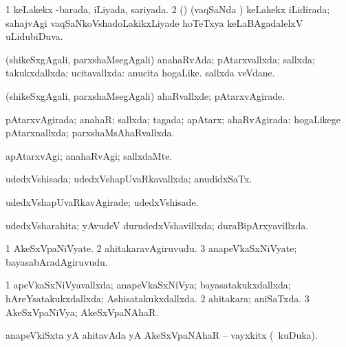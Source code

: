 {\bentry
{} 
\gl{\gu}
\expl{}
\bmng
\bnum
\num{1} keLakekx -barada, iLiyada, sariyada. 
\num{2} (\veYshA) (vaqSaNda \vi) keLakekx iLidirada; sahajvAgi vaqSaNkoVshadoLakikxLiyade hoTeTxya keLaBAgadalelxV uLidubiDuva. 
\enum
\emng
\eentry

\bentry
{} 
\gl{\gu}
\expl{}
\bmng
 (shikeSxgAgali, parxshaMsegAgali) anahaRvAda; pAtarxvallxda; sallxda; takukxdallxda; ucitavallxda:  anucita hogaLike.  sallxda veVdane. 
\emng
\eentry

\bentry
{} 
\gl{\kirxvi}
\expl{}
\bmng
 (shikeSxgAgali, parxshaMsegAgali) ahaRvallxde; pAtarxvAgirade. 
\emng
\eentry

\bentry
{} 
\gl{\gu}
\expl{}
\bmng
 pAtarxvAgirada; anahaR; sallxda; tagada; apAtarx; ahaRvAgirada:  hogaLikege pAtarxnallxda; parxshaMsAhaRvallxda. 
\emng
\eentry

\bentry
{} 
\gl{\kirxvi}
\expl{}
\bmng
 apAtarxvAgi; anahaRvAgi; sallxdaMte. 
\emng
\eentry

\bentry
{} 
\gl{\gu}
\expl{}
\bmng
 udedxVshisada; udedxVshapUvaRkavallxda; anudidxSaTx. 
\emng
\eentry

\bentry
{} 
\gl{\kirxvi}
\expl{}
\bmng
udedxVshapUvaRkavAgirade; udedxVshisade. 
\emng
\eentry

\bentry
{} 
\gl{\gu}
\expl{}
\bmng
 udedxVsharahita; yAvudeV durudedxVshavillxda; duraBipArxyavillxda. 
\emng
\eentry

\bentry
{} 
\gl{\nA}
\expl{}
\bmng
\bnum
\num{1} AkeSxVpaNiVyate. 
\num{2} ahitakaravAgiruvudu. 
\num{3} anapeVkaSxNiVyate; bayasabAradAgiruvudu. 
\enum
\emng
\eentry

\bentry
{} 
\gl{\gu}
\expl{}
\bmng
\bnum
\num{1} apeVkaSxNiVyavallxda; anapeVkaSxNiVya; bayasatakukxdallxda; hAreYsatakukxdallxda; Ashisatakukxdallxda. 
\num{2} ahitakara; aniSaTxda. 
\num{3} AkeSxVpaNiVya; AkeSxVpaNAhaR. 
\enum
\emng
\eentry

\bentry
{} 
\gl{\nA}
\expl{}
\bmng
 anapeVkiSxta yA ahitavAda yA AkeSxVpaNAhaR -- vayxkitx (\kanmu\ kuDuka). 
\emng
\eentry

}
